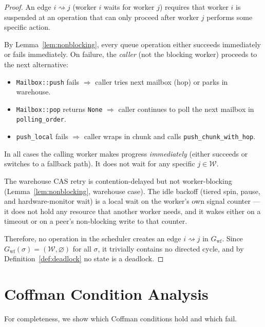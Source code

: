 \documentclass[11pt,a4paper]{report}
\newcommand{\code}[1]{\texttt{#1}}
\begin{document}
\begin{proof}
An edge $i \rightsquigarrow j$ (worker $i$ waits for worker $j$)
requires that worker $i$ is suspended at an operation that can only
proceed after worker $j$ performs some specific action.

By Lemma~\ref{lem:nonblocking}, every queue operation either
succeeds immediately or fails immediately.  On failure, the
\emph{caller} (not the blocking worker) proceeds to the next
alternative:
\begin{itemize}
  \item \code{Mailbox::push} fails $\Rightarrow$ caller tries
        next mailbox (hop) or parks in warehouse.
  \item \code{Mailbox::pop} returns \code{None} $\Rightarrow$ caller
        continues to poll the next mailbox in \code{polling\_order}.
  \item \code{push\_local} fails $\Rightarrow$ caller wraps in chunk
        and calls \code{push\_chunk\_with\_hop}.
\end{itemize}
In all cases the calling worker makes progress \emph{immediately}
(either succeeds or switches to a fallback path).  It does not wait
for any specific $j \in \mathcal{W}$.

The warehouse CAS retry is contention-delayed but not
worker-blocking (Lemma~\ref{lem:nonblocking}, warehouse case).
The idle backoff (tiered spin, pause, and hardware-monitor wait) is a
local wait on the worker's own signal counter --- it does not hold
any resource that another worker needs, and it wakes either on a
timeout or on a peer's non-blocking write to that counter.

Therefore, no operation in the scheduler creates an edge $i
\rightsquigarrow j$ in $G_{\text{wf}}$.  Since
$G_{\text{wf}}(\sigma) = (\mathcal{W}, \varnothing)$ for all
$\sigma$, it trivially contains no directed cycle, and by
Definition~\ref{def:deadlock} no state is a deadlock.
\end{proof}

\section{Coffman Condition Analysis}

For completeness, we show which Coffman conditions hold and which fail.
\end{document}
